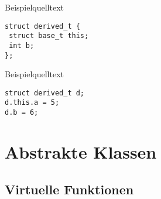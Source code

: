 \documentclass{article}
\newenvironment{code}{\captionsetup{type=listing}}{}
\begin{document}
\begin{code}
\caption{Beispielquelltext}
\begin{verbatim}
struct derived_t {
 struct base_t this;
 int b;
};
\end{verbatim}
\end{code}

\begin{code}
\caption{Beispielquelltext}
\begin{verbatim}
struct derived_t d;
d.this.a = 5;
d.b = 6;
\end{verbatim}
\end{code}


\section{Abstrakte Klassen}
\subsection{Virtuelle Funktionen}










\end{document}
